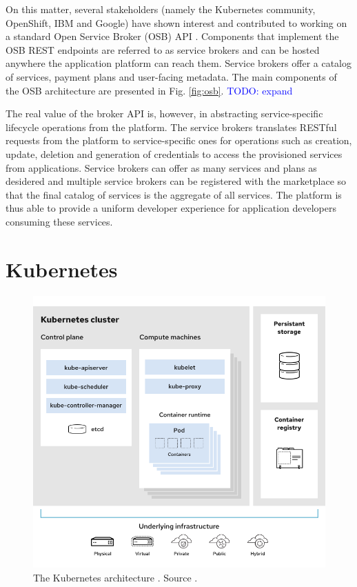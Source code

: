 On this matter, several stakeholders (namely the Kubernetes community, OpenShift, IBM and Google) have shown interest and contributed to working on a standard Open Service Broker (OSB) API \cite{osb}. Components that implement the OSB REST endpoints are referred to as service brokers and can be hosted anywhere the application platform can reach them. Service brokers offer a catalog of services, payment plans and user-facing metadata. The main components of the OSB architecture are presented in Fig. \ref{fig:osb}. \textcolor{blue}{TODO: expand}

The real value of the broker API is, however, in abstracting service-specific lifecycle operations from the platform. The service brokers translates RESTful requests from the platform to service-specific ones for operations such as creation, update, deletion and generation of credentials to access the provisioned services from applications. Service brokers can offer as many services and plans as desidered and multiple service brokers can be registered with the marketplace so that the final catalog of services is the aggregate of all services. The platform is thus able to provide a uniform developer experience for application developers consuming these services.

\section{Kubernetes}
\label{sec:kubernetes}

\begin{figure}[h]
\centering
\includegraphics[width=\columnwidth]{figures/kubernetes}
\caption{The Kubernetes architecture \label{fig:kubernetes}. Source \cite{k8s-architecture}.}
\end{figure}

